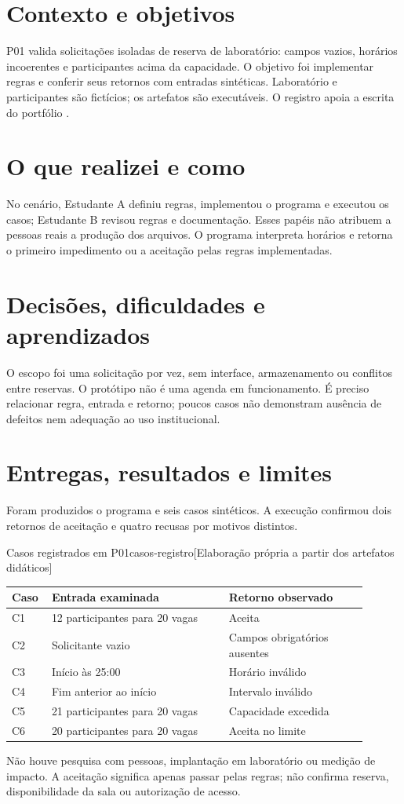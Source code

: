 \section*{Contexto e objetivos}
P01 valida solicitações isoladas de reserva de laboratório: campos vazios,
horários incoerentes e participantes acima da capacidade. O objetivo foi
implementar regras e conferir seus retornos com entradas sintéticas.
Laboratório e participantes são fictícios; os artefatos são executáveis.
O registro apoia a escrita do portfólio .

\section*{O que realizei e como}
No cenário, Estudante A definiu regras, implementou o programa e executou os
casos; Estudante B revisou regras e documentação. Esses papéis não atribuem
a pessoas reais a produção dos arquivos. O programa interpreta horários e
retorna o primeiro impedimento ou a aceitação pelas regras implementadas.

\section*{Decisões, dificuldades e aprendizados}
O escopo foi uma solicitação por vez, sem interface, armazenamento ou
conflitos entre reservas. O protótipo não é uma agenda em funcionamento.
É preciso relacionar regra, entrada e retorno; poucos casos não demonstram
ausência de defeitos nem adequação ao uso institucional.

\section*{Entregas, resultados e limites}
Foram produzidos o programa e seis casos sintéticos. A execução confirmou
dois retornos de aceitação e quatro recusas por motivos distintos.
\begin{undftabela}[H]{Casos registrados em P01}{casos-registro}[Elaboração própria a partir dos artefatos didáticos]
\begin{tabular}{@{}p{0.08\linewidth}p{0.46\linewidth}p{0.36\linewidth}@{}}
\hline
\textbf{Caso} & \textbf{Entrada examinada} & \textbf{Retorno observado} \\
\hline
C1 & 12 participantes para 20 vagas & Aceita \\
C2 & Solicitante vazio & Campos obrigatórios ausentes \\
C3 & Início às 25:00 & Horário inválido \\
C4 & Fim anterior ao início & Intervalo inválido \\
C5 & 21 participantes para 20 vagas & Capacidade excedida \\
C6 & 20 participantes para 20 vagas & Aceita no limite \\
\hline
\end{tabular}
\end{undftabela}
Não houve pesquisa com pessoas, implantação em laboratório ou medição de
impacto. A aceitação significa apenas passar pelas regras; não confirma
reserva, disponibilidade da sala ou autorização de acesso.

